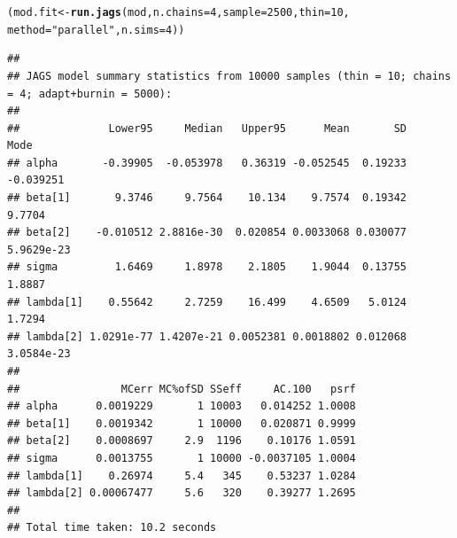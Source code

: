 \documentclass[]{beamer}\usepackage[]{graphicx}\usepackage[]{color}
\makeatletter
\newcommand{\hlnum}[1]{\textcolor[rgb]{0.686,0.059,0.569}{#1}}%
\newcommand{\hlstr}[1]{\textcolor[rgb]{0.192,0.494,0.8}{#1}}%
\newcommand{\hlstd}[1]{\textcolor[rgb]{0.345,0.345,0.345}{#1}}%
\newcommand{\hlkwb}[1]{\textcolor[rgb]{0.69,0.353,0.396}{#1}}%
\newcommand{\hlkwc}[1]{\textcolor[rgb]{0.333,0.667,0.333}{#1}}%
\newcommand{\hlkwd}[1]{\textcolor[rgb]{0.737,0.353,0.396}{\textbf{#1}}}%
\newenvironment{kframe}{%
 \def\at@end@of@kframe{}%
 \ifinner\ifhmode%
  \def\at@end@of@kframe{\end{minipage}}%
  \begin{minipage}{\columnwidth}%
 \fi\fi%
 \def\FrameCommand##1{\hskip\@totalleftmargin \hskip-\fboxsep
 \colorbox{shadecolor}{##1}\hskip-\fboxsep
     \hskip-\linewidth \hskip-\@totalleftmargin \hskip\columnwidth}%
 \MakeFramed {\advance\hsize-\width
   \@totalleftmargin\z@ \linewidth\hsize
   \@setminipage}}%
 {\par\unskip\endMakeFramed%
 \at@end@of@kframe}
\newenvironment{knitrout}{}{} %
\makeatother
\begin{document}
\newsavebox{\ipriorjagsc}
\begin{lrbox}{\ipriorjagsc}
\begin{knitrout}\scriptsize
{}\color{fgcolor}\begin{kframe}
\begin{alltt}
\hlstd{(mod.fit} \hlkwb{<-} \hlkwd{run.jags}\hlstd{(mod,} \hlkwc{n.chains} \hlstd{=} \hlnum{4}\hlstd{,} \hlkwc{sample} \hlstd{=} \hlnum{2500}\hlstd{,} \hlkwc{thin} \hlstd{=} \hlnum{10}\hlstd{,}
                     \hlkwc{method} \hlstd{=} \hlstr{"parallel"}\hlstd{,} \hlkwc{n.sims} \hlstd{=} \hlnum{4}\hlstd{))}
\end{alltt}
\begin{verbatim}
## 
## JAGS model summary statistics from 10000 samples (thin = 10; chains = 4; adapt+burnin = 5000):
##                                                                        
##              Lower95     Median   Upper95      Mean       SD       Mode
## alpha       -0.39905  -0.053978   0.36319 -0.052545  0.19233  -0.039251
## beta[1]       9.3746     9.7564    10.134    9.7574  0.19342     9.7704
## beta[2]    -0.010512 2.8816e-30  0.020854 0.0033068 0.030077 5.9629e-23
## sigma         1.6469     1.8978    2.1805    1.9044  0.13755     1.8887
## lambda[1]    0.55642     2.7259    16.499    4.6509   5.0124     1.7294
## lambda[2] 1.0291e-77 1.4207e-21 0.0052381 0.0018802 0.012068 3.0584e-23
##                                                     
##                MCerr MC%ofSD SSeff     AC.100   psrf
## alpha      0.0019229       1 10003   0.014252 1.0008
## beta[1]    0.0019342       1 10000   0.020871 0.9999
## beta[2]    0.0008697     2.9  1196    0.10176 1.0591
## sigma      0.0013755       1 10000 -0.0037105 1.0004
## lambda[1]    0.26974     5.4   345    0.53237 1.0284
## lambda[2] 0.00067477     5.6   320    0.39277 1.2695
## 
## Total time taken: 10.2 seconds
\end{verbatim}
\end{kframe}
\end{knitrout}
\end{lrbox}
\end{document}
